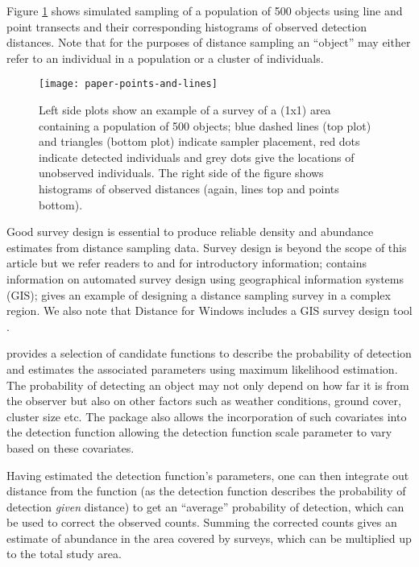 \documentclass[article]{jss}
\begin{document}
Figure \ref{fig:pointslines} shows simulated sampling of a population of 500 objects using line and point transects and their corresponding histograms of observed detection distances. Note that for the purposes of distance sampling an ``object'' may either refer to an individual in a population or a cluster of individuals.  

\begin{figure}
\begin{center}
\texttt{[image: paper-points-and-lines]}
\caption{Left side plots show an example of a survey of a (1x1) area containing a population of 500 objects; blue dashed lines (top plot) and triangles (bottom plot) indicate sampler placement, red dots indicate detected individuals and grey dots give the locations of unobserved individuals. The right side of the figure shows histograms of observed distances (again, lines top and points bottom).}
\label{fig:pointslines}
\end{center}
\end{figure}


Good survey design is essential to produce reliable density and abundance estimates from distance sampling data. Survey design is beyond the scope of this article but we refer readers to \cite[][Chapter 7]{Buckland:2001vm} and \cite[][Chapter 2]{buckland2015distance} for introductory information; \cite{Strindberg:2004vr} contains information on automated survey design using geographical information systems (GIS); \cite{Thomas:2007wz} gives an example of designing a distance sampling survey in a complex region. We also note that Distance for Windows includes a GIS survey design tool \citep{Thomas:2010cf}.

 provides a selection of candidate functions to describe the probability of detection and estimates the associated parameters using maximum likelihood estimation. The probability of detecting an object may not only depend on how far it is from the observer but also on other factors such as weather conditions, ground cover, cluster size etc. The  package also allows the incorporation of such covariates into the detection function allowing the detection function scale parameter to vary based on these covariates.

Having estimated the detection function's parameters, one can then integrate out distance from the function (as the detection function describes the probability of detection \textit{given} distance) to get an ``average'' probability of detection, which can be used to correct the observed counts. Summing the corrected counts gives an estimate of abundance in the area covered by surveys, which can be multiplied up to the total study area.
\end{document}
